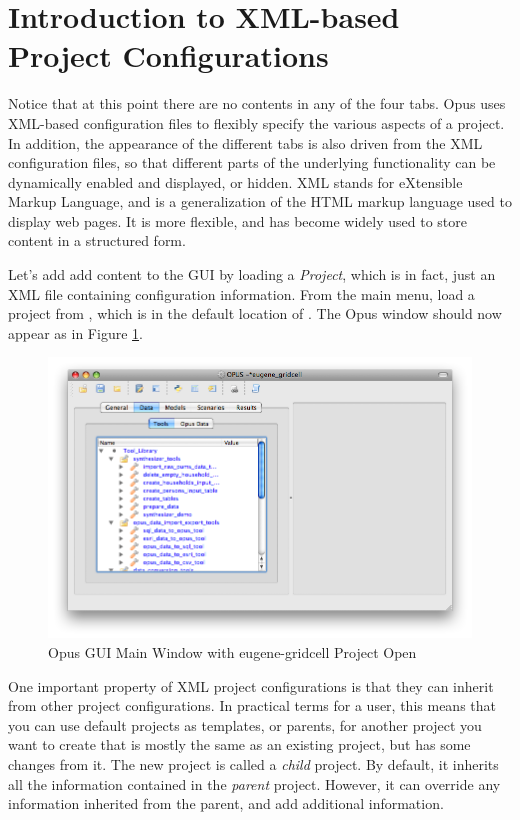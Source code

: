 \section{Introduction to XML-based Project Configurations}
\label{sec:intro-to-xml-based-project-configurations}

Notice that at this point there are no contents in any of the four tabs.
Opus uses XML-based configuration files to flexibly specify the various
aspects of a project.  In addition, the appearance of the different tabs is
also driven from the XML configuration files, so that different parts of
the underlying functionality can be dynamically enabled and displayed, or
hidden.  XML stands for eXtensible Markup Language, and is a generalization
of the HTML markup language used to display web pages.  It is more
flexible, and has become widely used to store content in a structured form.

Let's add add content to the GUI by loading a \emph{Project}, which is in
fact, just an XML file containing configuration information.  From the main
menu, load a project from , which is in the
default location of .  The Opus window should
now appear as in Figure \ref{fig:opus2}.

\begin{figure}[htp]
\begin{center}
\includegraphics[scale=0.52]{part-gui/images/opus-open-project.png}
\end{center}
\caption{Opus GUI Main Window with eugene-gridcell Project Open}
\label{fig:opus2}
\end{figure}

One important property of XML project configurations is that they can
inherit from other project configurations.  In practical terms for a user,
this means that you can use default projects as templates, or parents, for
another project you want to create that is mostly the same as an existing
project, but has some changes from it.  The new project is called a
\emph{child} project.  By default, it inherits all the information
contained in the \emph{parent} project.  However, it can override any
information inherited from the parent, and add additional information.


